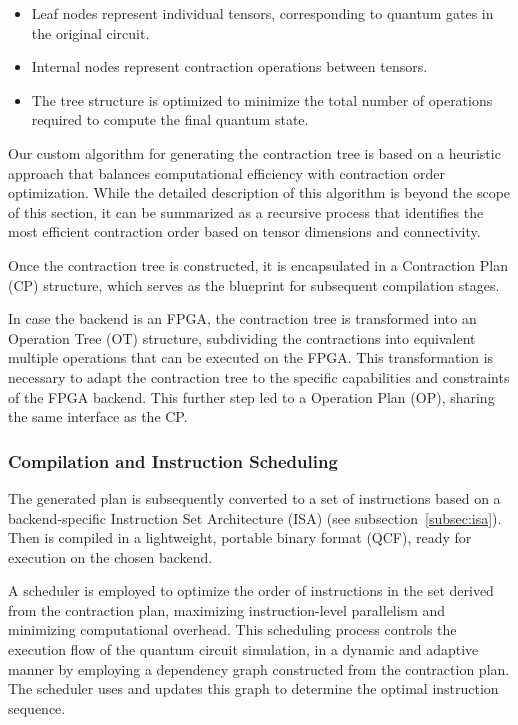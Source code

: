 \documentclass[12pt,oneside,a4paper]{article}
\begin{document}
\begin{itemize}
    \item Leaf nodes represent individual tensors, corresponding to quantum gates in the original circuit.
    \item Internal nodes represent contraction operations between tensors.
    \item The tree structure is optimized to minimize the total number of operations required to compute the final quantum state.
\end{itemize}

Our custom algorithm for generating the contraction tree is based on a heuristic approach that balances computational efficiency with contraction order optimization. While the detailed description of this algorithm is beyond the scope of this section, it can be summarized as a recursive process that identifies the most efficient contraction order based on tensor dimensions and connectivity.

Once the contraction tree is constructed, it is encapsulated in a Contraction Plan (CP) structure, which serves as the blueprint for subsequent compilation stages.

In case the backend is an FPGA, the contraction tree is transformed into an Operation Tree (OT) structure, subdividing the contractions into equivalent multiple operations that can be executed on the FPGA. This transformation is necessary to adapt the contraction tree to the specific capabilities and constraints of the FPGA backend. This further step led to a Operation Plan (OP), sharing the same interface as the CP.

\subsubsection{Compilation and Instruction Scheduling}

The generated plan is subsequently converted to a set of instructions based on a backend-specific Instruction Set Architecture (ISA) (see subsection~\ref{subsec:isa}). Then is compiled in a lightweight, portable binary format (QCF), ready for execution on the chosen backend.

A scheduler is employed to optimize the order of instructions in the set derived from the contraction plan, maximizing instruction-level parallelism and minimizing computational overhead. This scheduling process controls the execution flow of the quantum circuit simulation, in a dynamic and adaptive manner by employing a dependency graph constructed from the contraction plan. The scheduler uses and updates this graph to determine the optimal instruction sequence.
\end{document}
